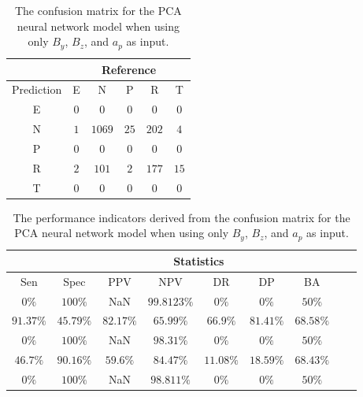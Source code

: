 \begin{table}[!ht]
	\centering
	\begin{tabular}{|c|c|c|c|c|c|}
		\hline
		 & \multicolumn{5}{|c|}{Reference} \\ \hline
		 Prediction & E & N & P & R & T \\ \hline
		 E & $0$ & $0$ & $0$ & $0$ & $0$ \\ \hline
		 N & $1$ & $1069$ & $25$ & $202$ & $4$ \\ \hline
		 P & $0$ & $0$ & $0$ & $0$ & $0$ \\ \hline
		 R & $2$ & $101$ & $2$ & $177$ & $15$ \\ \hline
		 T & $0$ & $0$ & $0$ & $0$ & $0$ \\ \hline
	\end{tabular}
	\caption{The confusion matrix for the PCA neural network model when using only $B_{y}$, $B_{z}$, and $a_{p}$ as input.}
	\label{tab:cm:yzap:pcaNNet}
\end{table}

\begin{table}[!ht]
	\centering
	\begin{tabular}{|c|c|c|c|c|c|c|c|c|}
		\hline
		 & \multicolumn{7}{c|}{Statistics} \\ \hline
		Sen & Spec & PPV & NPV & DR & DP & BA \\ \hline
		$0\%$ & $100\%$ & NaN & $99.8123\%$ & $0\%$ & $0\%$ & $50\%$ \\ \hline
		$91.37\%$ & $45.79\%$ & $82.17\%$ & $65.99\%$ & $66.9\%$ & $81.41\%$ & $68.58\%$ \\ \hline
		$0\%$ & $100\%$ & NaN & $98.31\%$ & $0\%$ & $0\%$ & $50\%$ \\ \hline
		$46.7\%$ & $90.16\%$ & $59.6\%$ & $84.47\%$ & $11.08\%$ & $18.59\%$ & $68.43\%$ \\ \hline
		$0\%$ & $100\%$ & NaN & $98.811\%$ & $0\%$ & $0\%$ & $50\%$ \\ \hline
	\end{tabular}
	\caption{The performance indicators derived from the confusion matrix for the PCA neural network model when using only $B_{y}$, $B_{z}$, and $a_{p}$ as input.}
	\label{tab:cs:yzap:pcaNNet}
\end{table}

